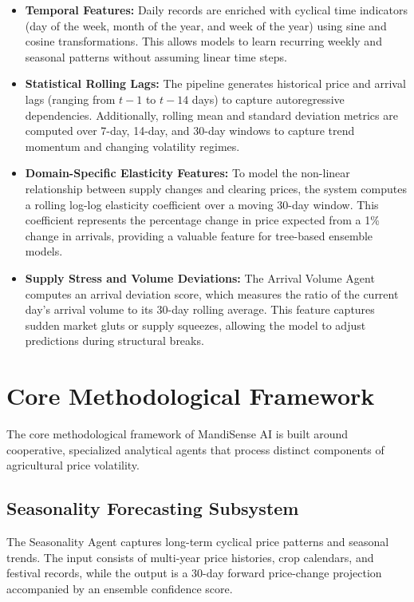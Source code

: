 \documentclass[12pt,a4paper]{report}
\theoremstyle{definition}
\theoremstyle{remark}
\begin{document}
\begin{itemize}
    \item \textbf{Temporal Features:} Daily records are enriched with cyclical time indicators (day of the week, month of the year, and week of the year) using sine and cosine transformations. This allows models to learn recurring weekly and seasonal patterns without assuming linear time steps.
    \item \textbf{Statistical Rolling Lags:} The pipeline generates historical price and arrival lags (ranging from $t-1$ to $t-14$ days) to capture autoregressive dependencies. Additionally, rolling mean and standard deviation metrics are computed over 7-day, 14-day, and 30-day windows to capture trend momentum and changing volatility regimes.
    \item \textbf{Domain-Specific Elasticity Features:} To model the non-linear relationship between supply changes and clearing prices, the system computes a rolling log-log elasticity coefficient over a moving 30-day window. This coefficient represents the percentage change in price expected from a 1\% change in arrivals, providing a valuable feature for tree-based ensemble models.
    \item \textbf{Supply Stress and Volume Deviations:} The Arrival Volume Agent computes an arrival deviation score, which measures the ratio of the current day's arrival volume to its 30-day rolling average. This feature captures sudden market gluts or supply squeezes, allowing the model to adjust predictions during structural breaks.
\end{itemize}

\section{Core Methodological Framework}

The core methodological framework of MandiSense AI is built around cooperative, specialized analytical agents that process distinct components of agricultural price volatility.

\subsection{Seasonality Forecasting Subsystem}

The Seasonality Agent captures long-term cyclical price patterns and seasonal trends. The input consists of multi-year price histories, crop calendars, and festival records, while the output is a 30-day forward price-change projection accompanied by an ensemble confidence score.
\end{document}
